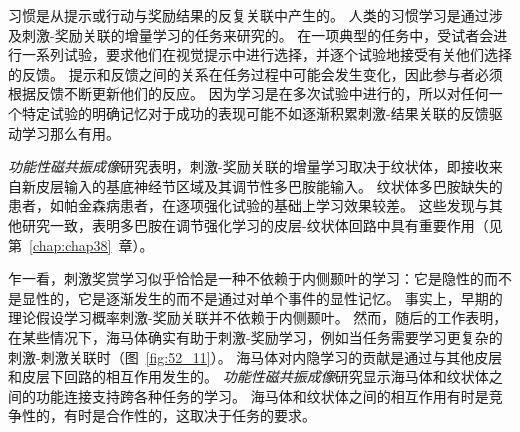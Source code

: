习惯是从提示或行动与奖励结果的反复关联中产生的。
人类的习惯学习是通过涉及刺激-奖励关联的增量学习的任务来研究的。
在一项典型的任务中，受试者会进行一系列试验，要求他们在视觉提示中进行选择，并逐个试验地接受有关他们选择的反馈。
提示和反馈之间的关系在任务过程中可能会发生变化，因此参与者必须根据反馈不断更新他们的反应。
因为学习是在多次试验中进行的，所以对任何一个特定试验的明确记忆对于成功的表现可能不如逐渐积累刺激-结果关联的反馈驱动学习那么有用。


\textit{功能性磁共振成像}研究表明，刺激-奖励关联的增量学习取决于纹状体，即接收来自新皮层输入的基底神经节区域及其调节性多巴胺能输入。
纹状体多巴胺缺失的患者，如帕金森病患者，在逐项强化试验的基础上学习效果较差。
这些发现与其他研究一致，表明多巴胺在调节强化学习的皮层-纹状体回路中具有重要作用（见第~\ref{chap:chap38}~章）。


乍一看，刺激奖赏学习似乎恰恰是一种不依赖于内侧颞叶的学习：它是隐性的而不是显性的，它是逐渐发生的而不是通过对单个事件的显性记忆。
事实上，早期的理论假设学习概率刺激-奖励关联并不依赖于内侧颞叶。
然而，随后的工作表明，在某些情况下，海马体确实有助于刺激-奖励学习，例如当任务需要学习更复杂的刺激-刺激关联时（图~\ref{fig:52_11}）。
海马体对内隐学习的贡献是通过与其他皮层和皮层下回路的相互作用发生的。
\textit{功能性磁共振成像}研究显示海马体和纹状体之间的功能连接支持跨各种任务的学习。
海马体和纹状体之间的相互作用有时是竞争性的，有时是合作性的，这取决于任务的要求。


